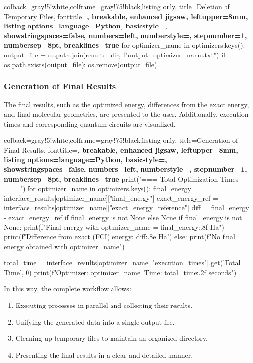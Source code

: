 \begin{tcblisting}{colback=gray!5!white,colframe=gray!75!black,listing only,
    title=Deletion of Temporary Files, fonttitle=\bfseries, breakable, enhanced jigsaw, leftupper=8mm,
    listing options={language=Python, basicstyle=\ttfamily\small,
    showstringspaces=false, numbers=left, numberstyle=\footnotesize,
    stepnumber=1, numbersep=8pt, breaklines=true}}
for optimizer_name in optimizers.keys():
    output_file = os.path.join(results_dir, f"output_{optimizer_name}.txt")
    if os.path.exists(output_file):
        os.remove(output_file)
\end{tcblisting}

\subsubsection{Generation of Final Results}
The final results, such as the optimized energy, differences from the exact energy, and final molecular geometries, are presented to the user. Additionally, execution times and corresponding quantum circuits are visualized.

\begin{tcblisting}{colback=gray!5!white,colframe=gray!75!black,listing only,
    title=Generation of Final Results, fonttitle=\bfseries, breakable, enhanced jigsaw, leftupper=8mm,
    listing options={language=Python, basicstyle=\ttfamily\small,
    showstringspaces=false, numbers=left, numberstyle=\footnotesize,
    stepnumber=1, numbersep=8pt, breaklines=true}}
print("=== Total Optimization Times ===\n")
for optimizer_name in optimizers.keys():
    final_energy = interface_results[optimizer_name]["final_energy"]
    exact_energy_ref = interface_results[optimizer_name]["exact_energy_reference"]
    diff = final_energy - exact_energy_ref if final_energy is not None else None
    if final_energy is not None:
        print(f"Final energy with {optimizer_name} = {final_energy:.8f} Ha")
        print(f"Difference from exact (FCI) energy: {diff:.8e} Ha\n")
    else:
        print(f"No final energy obtained with {optimizer_name}\n")

    total_time = interface_results[optimizer_name]["execution_times"].get('Total Time', 0)
    print(f"Optimizer: {optimizer_name}, Time: {total_time:.2f} seconds")
\end{tcblisting}

In this way, the complete workflow allows:
\begin{enumerate}
    \item Executing processes in parallel and collecting their results.
    \item Unifying the generated data into a single output file.
    \item Cleaning up temporary files to maintain an organized directory.
    \item Presenting the final results in a clear and detailed manner.
\end{enumerate}

